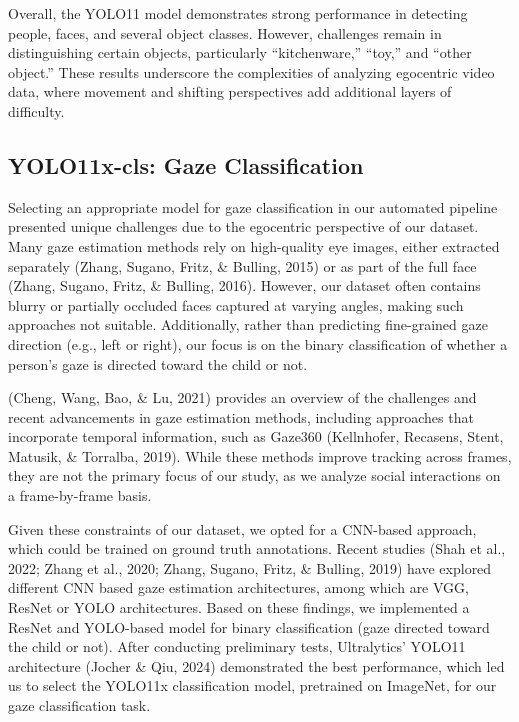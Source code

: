 \documentclass[
  man,floatsintext]{apa6}
\begin{document}
Overall, the YOLO11 model demonstrates strong performance in detecting people, faces, and several object classes. However, challenges remain in distinguishing certain objects, particularly ``kitchenware,'' ``toy,'' and ``other object.'' These results underscore the complexities of analyzing egocentric video data, where movement and shifting perspectives add additional layers of difficulty.

\subsection{YOLO11x-cls: Gaze Classification}\label{yolo11x-cls-gaze-classification}

Selecting an appropriate model for gaze classification in our automated pipeline presented unique challenges due to the egocentric perspective of our dataset. Many gaze estimation methods rely on high-quality eye images, either extracted separately (Zhang, Sugano, Fritz, \& Bulling, 2015) or as part of the full face (Zhang, Sugano, Fritz, \& Bulling, 2016). However, our dataset often contains blurry or partially occluded faces captured at varying angles, making such approaches not suitable. Additionally, rather than predicting fine-grained gaze direction (e.g., left or right), our focus is on the binary classification of whether a person's gaze is directed toward the child or not.

(Cheng, Wang, Bao, \& Lu, 2021) provides an overview of the challenges and recent advancements in gaze estimation methods, including approaches that incorporate temporal information, such as Gaze360 (Kellnhofer, Recasens, Stent, Matusik, \& Torralba, 2019). While these methods improve tracking across frames, they are not the primary focus of our study, as we analyze social interactions on a frame-by-frame basis.

Given these constraints of our dataset, we opted for a CNN-based approach, which could be trained on ground truth annotations. Recent studies (Shah et al., 2022; Zhang et al., 2020; Zhang, Sugano, Fritz, \& Bulling, 2019) have explored different CNN based gaze estimation architectures, among which are VGG, ResNet or YOLO architectures. Based on these findings, we implemented a ResNet and YOLO-based model for binary classification (gaze directed toward the child or not). After conducting preliminary tests, Ultralytics' YOLO11 architecture (Jocher \& Qiu, 2024) demonstrated the best performance, which led us to select the YOLO11x classification model, pretrained on ImageNet, for our gaze classification task.
\end{document}
